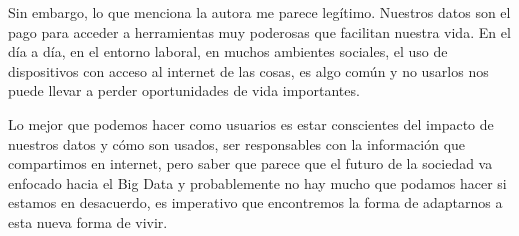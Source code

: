 \documentclass[12pt]{report}
\begin{document}
\begin{enumerate}[label=\textbf{\arabic*.}, leftmargin=*]
Sin embargo, lo que menciona la autora me parece legítimo. Nuestros datos son el pago para acceder a herramientas muy poderosas que facilitan nuestra vida. En el día a día, en el entorno laboral, en muchos ambientes sociales, el uso de dispositivos con acceso al internet de las cosas, es algo común y no usarlos nos puede llevar a perder oportunidades de vida importantes.

Lo mejor que podemos hacer como usuarios es estar conscientes del impacto de nuestros datos y cómo son usados, ser responsables con la información que compartimos en internet, pero saber que parece que el futuro de la sociedad va enfocado hacia el Big Data y probablemente no hay mucho que podamos hacer si estamos en desacuerdo, es imperativo que encontremos la forma de adaptarnos a esta nueva forma de vivir.

\end{enumerate}
\end{document}
